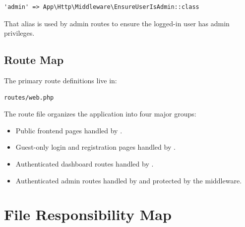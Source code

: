 \documentclass[11pt,a4paper]{article}
\begin{document}
\begin{verbatim}
'admin' => App\Http\Middleware\EnsureUserIsAdmin::class
\end{verbatim}

That alias is used by admin routes to ensure the logged-in user has admin privileges.

\subsection{Route Map}

The primary route definitions live in:

\begin{verbatim}
routes/web.php
\end{verbatim}

The route file organizes the application into four major groups:

\begin{itemize}
    \item Public frontend pages handled by .
    \item Guest-only login and registration pages handled by .
    \item Authenticated dashboard routes handled by .
    \item Authenticated admin routes handled by  and protected by the  middleware.
\end{itemize}

\section{File Responsibility Map}
\end{document}
